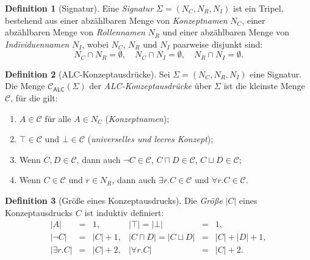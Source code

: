 ﻿\documentclass[a4paper,12pt]{article}
\theoremstyle{definition}
\newtheorem{definition}{Definition}[section]
\theoremstyle{plain}
\theoremstyle{remark}
\begin{document}
\begin{definition}[Signatur]
\label{def:signatur}
Eine \emph{Signatur} $\Sigma = (N_C, N_R, N_I)$ ist ein Tripel,
bestehend aus einer abz{\"{a}}hlbaren Menge von \emph{Konzeptnamen} $N_C$,
einer abz{\"{a}}hlbaren Menge von \emph{Rollennamen} $N_R$ und
einer abz{\"{a}}hlbaren Menge von \emph{Individuennamen} $N_I$,
wobei $N_C$, $N_R$ und $N_I$ paarweise disjunkt sind:
\[
  N_C \cap N_R = \emptyset, \quad
  N_C \cap N_I = \emptyset, \quad
  N_R \cap N_I = \emptyset.
\]
\end{definition}

\begin{definition}[ALC-Konzeptausdr{\"{u}}cke]
\label{def:alc-syntax}
Sei $\Sigma = (N_C, N_R, N_I)$ eine Signatur.
Die Menge $\mathcal{C}_{\textsf{ALC}}(\Sigma)$ der
\emph{\textsf{ALC}-Konzeptausdr{\"{u}}cke} {\"{u}}ber $\Sigma$
ist die kleinste Menge $\mathcal{C}$, f{\"{u}}r die gilt:
\begin{enumerate}[label=(\roman*)]
  \item $A \in \mathcal{C}$ f{\"{u}}r alle $A \in N_C$
        (\emph{Konzeptnamen});
  \item $\top \in \mathcal{C}$ und $\bot \in \mathcal{C}$
        (\emph{universelles und leeres Konzept});
  \item Wenn $C, D \in \mathcal{C}$, dann auch
        $\neg C \in \mathcal{C}$,
        $C \sqcap D \in \mathcal{C}$,
        $C \sqcup D \in \mathcal{C}$;
  \item Wenn $C \in \mathcal{C}$ und $r \in N_R$, dann auch
        $\exists r.C \in \mathcal{C}$ und
        $\forall r.C \in \mathcal{C}$.
\end{enumerate}
\end{definition}

\begin{definition}[Gr{\"{o}}{\ss}e eines Konzeptausdrucks]
Die \emph{Gr{\"{o}}{\ss}e} $|C|$ eines Konzeptausdrucks $C$ ist induktiv
definiert:
\[
\begin{array}{rclrcl}
  |A| &=& 1, &
  |\top| = |\bot| &=& 1, \\
  |\neg C| &=& |C| + 1, &
  |C \sqcap D| = |C \sqcup D| &=& |C| + |D| + 1, \\
  |\exists r.C| &=& |C| + 2, &
  |\forall r.C| &=& |C| + 2.
\end{array}
\]
\end{definition}
\end{document}
